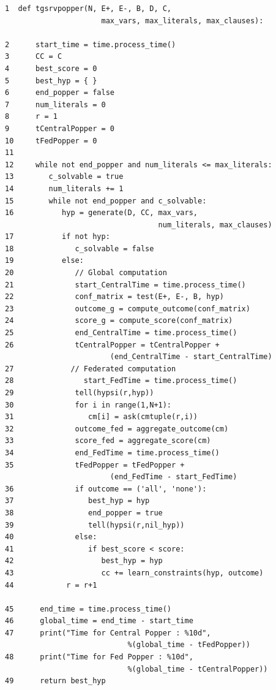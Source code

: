\begin{algorithm}[!t]
  \caption{Srvpopper client for performance tests}
  \label{alg:tgsrvpopper}
  \small
  \begin{lstlisting}[breaklines=true, breakatwhitespace=true]
1  def tgsrvpopper(N, E+, E-, B, D, C, 
                      max_vars, max_literals, max_clauses):
  
2      start_time = time.process_time()     
3      CC = C
4      best_score = 0
5      best_hyp = { }
6      end_popper = false
7      num_literals = 0
8      r = 1
9      tCentralPopper = 0
10     tFedPopper = 0
11  
12     while not end_popper and num_literals <= max_literals:
13        c_solvable = true
14        num_literals += 1
15        while not end_popper and c_solvable:
16           hyp = generate(D, CC, max_vars, 
                                   num_literals, max_clauses)
17           if not hyp:
18              c_solvable = false
19           else:
20              // Global computation
21              start_CentralTime = time.process_time()
22              conf_matrix = test(E+, E-, B, hyp)
23              outcome_g = compute_outcome(conf_matrix)
24              score_g = compute_score(conf_matrix)
25              end_CentralTime = time.process_time()
26              tCentralPopper = tCentralPopper + 
                        (end_CentralTime - start_CentralTime)
27             // Federated computation
28                start_FedTime = time.process_time()
29              tell(hypsi(r,hyp))
30              for i in range(1,N+1):
31                 cm[i] = ask(cmtuple(r,i))
32              outcome_fed = aggregate_outcome(cm)
33              score_fed = aggregate_score(cm)
34              end_FedTime = time.process_time()
35              tFedPopper = tFedPopper + 
                        (end_FedTime - start_FedTime)
36              if outcome == ('all', 'none'):
37                 best_hyp = hyp
38                 end_popper = true
39                 tell(hypsi(r,nil_hyp))                
40              else:
41                 if best_score < score:
42                    best_hyp = hyp
43                    cc += learn_constraints(hyp, outcome)
44            r = r+1
             
45      end_time = time.process_time()
46      global_time = end_time - start_time
47      print("Time for Central Popper : %10d", 
                            %(global_time - tFedPopper))
48      print("Time for Fed Popper : %10d", 
                            %(global_time - tCentralPopper))
49      return best_hyp
  \end{lstlisting}
\end{algorithm}
